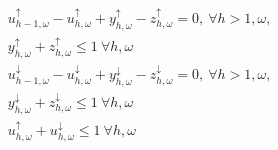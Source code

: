 {\begin{subequations}
\begin{align}
        \                                                                                             & u_{h-1,\omega}^{\uparrow} - u_{h,\omega}^{\uparrow} + y_{h,\omega}^{\uparrow} - z_{h,\omega}^{\uparrow} = 0, \    \forall{h>1,\omega},                                                                                                         \label{aux:1}                                       \\
        \                                                                                             & y_{h,\omega}^{\uparrow} + z_{h,\omega}^{\uparrow} \leq 1 \                                                             \forall{h,\omega}                                                                                                                                                                     \label{aux:2}                                              \\
        \                                                                                             & u_{h-1,\omega}^{\downarrow} - u_{h,\omega}^{\downarrow} + y_{h,\omega}^{\downarrow} - z_{h,\omega}^{\downarrow} = 0, \                                                                                                                                                                                                                                                    \forall{h>1, \omega},                                                                                                                                        \label{aux:3}                                       \\
        \                                                                                             & y_{h,\omega}^{\downarrow} + z_{h,\omega}^{\downarrow} \leq 1 \                                                         \forall{h,\omega}                                                                                                                                                                     \label{aux:4}                                              \\
        \                                                                                             & u_{h,\omega}^{\uparrow} + u_{h,\omega}^{\downarrow} \leq 1 \                                                           \forall{h,\omega}                                                                                                                                                                     \label{aux:5}                                              \\

\end{align}
\end{subequations}}
